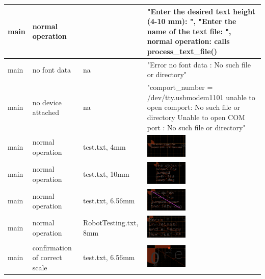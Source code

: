 \begin{longtable}{|>{\raggedright\arraybackslash}m{}|>{\raggedright\arraybackslash}m{}|>{\raggedright\arraybackslash}m{}|>{\raggedright\arraybackslash}m{}|}
        main & normal operation & 4mm &  "Enter the desired text height (4-10 mm): ", "Enter the name of the text file: ", normal operation: calls process\_text\_file()\\ \hline
        main & no font data & na & "Error no font data : No such file or directory"\\ \hline
        main & no device attached & na & "comport\_number = /dev/tty.usbmodem1101 unable to open comport: No such file or directory Unable to open COM port : No such file or directory"\\ \hline
        main & normal operation & test.txt, 4mm & \includegraphics[width=0.35\textwidth]{src/Screenshot 2024-12-11 at 21.19.08.png}\\ \hline
        main & normal operation & test.txt, 10mm & \includegraphics[width=0.35\textwidth]{src/Screenshot 2024-12-11 at 21.27.58.png}\\ \hline
        main & normal operation & test.txt, 6.56mm & \includegraphics[width=0.35\textwidth]{src/Screenshot 2024-12-11 at 21.55.33.png}\\ \hline
        main & normal operation & RobotTesting.txt, 8mm & \includegraphics[width=0.35\textwidth]{src/Screenshot 2024-12-11 at 22.53.43.png}\\ \hline
        main & confirmation of correct scale & test.txt, 6.56mm & \includegraphics[width=0.35\textwidth]{src/Screenshot 2024-12-11 at 21.58.13.png}\\ \hline

\end{longtable}

